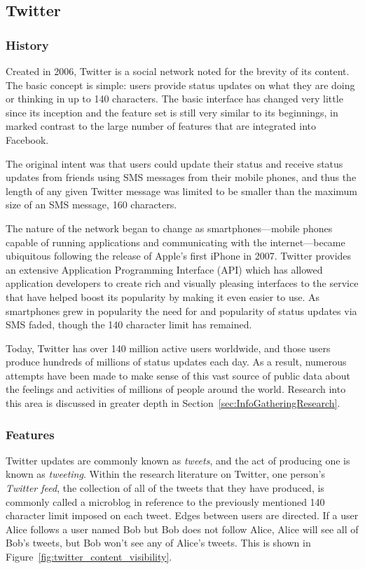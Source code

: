 \subsection{Twitter}

\subsubsection{History}

Created in 2006, Twitter is a social network noted for the brevity of its content. The basic concept is simple: users provide status updates on what they are doing or thinking in up to 140 characters. The basic interface has changed very little since its inception and the feature set is still very similar to its beginnings, in marked contrast to the large number of features that are integrated into Facebook.

The original intent was that users could update their status and receive status updates from friends using SMS messages from their mobile phones, and thus the length of any given Twitter message was limited to be smaller than the maximum size of an SMS message, 160 characters.

The nature of the network began to change as smartphones---mobile phones capable of running applications and communicating with the internet---became ubiquitous following the release of Apple's first iPhone in 2007. Twitter provides an extensive Application Programming Interface (API) which has allowed application developers to create rich and visually pleasing interfaces to the service that have helped boost its popularity by making it even easier to use. As smartphones grew in popularity the need for and popularity of status updates via SMS faded, though the 140 character limit has remained.

Today, Twitter has over 140 million active users worldwide, and those users produce hundreds of millions of status updates each day. As a result, numerous attempts have been made to make sense of this vast source of public data about the feelings and activities of millions of people around the world. Research into this area is discussed in greater depth in Section~\ref{sec:InfoGatheringResearch}.

\subsubsection{Features}

Twitter updates are commonly known as \emph{tweets}, and the act of producing one is known as \emph{tweeting}. Within the research literature on Twitter, one person's \emph{Twitter feed}, the collection of all of the tweets that they have produced, is commonly called a microblog in reference to the previously mentioned 140 character limit imposed on each tweet. Edges between users are directed. If a user Alice follows a user named Bob but Bob does not follow Alice, Alice will see all of Bob's tweets, but Bob won't see any of Alice's tweets. This is shown in Figure~\ref{fig:twitter_content_visibility}.

